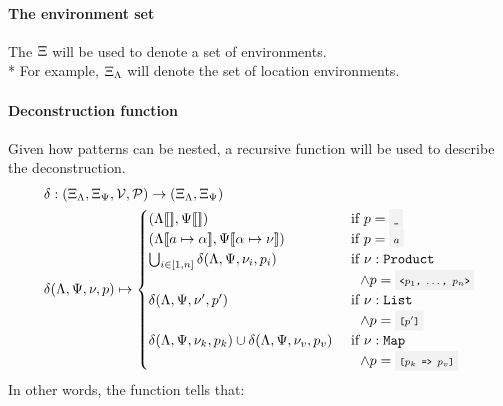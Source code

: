 \paragraph{The environment set} The $\Xi$ will be used to denote a set of
environments.\\*
For example, $\Xi_\Lambda$ will denote the set of location environments.

\paragraph{Deconstruction function} Given how patterns can be nested, a
recursive function will be used to describe the deconstruction.
\[
	\begin{split}
		\decons& : (\Env_\EnvLoc,\Env_\EnvStore,\Val,\Pattern) \to (\Env_\EnvLoc,\Env_\EnvStore) \\*
		\decons&(\EnvLoc,\EnvStore,\val, \pattern) \mapsto \begin{cases}
			(\EnvLoc\env{},\EnvStore\env{})                                                              &\text{ if } \pattern = \code{\_} \\*
			(\EnvLoc\env{a\mapsto\addr},\EnvStore\env{\addr\mapsto\val})                                 &\text{ if } \pattern = \code{$a$} \\*
			\bigcup_{i\in[1,n]}{\decons(\EnvLoc,\EnvStore,\val_i,\pattern_i)}                            &\text{ if } \val:\Product \\*
																										 &\quad\land \pattern = \code{<$\pattern_1$, $\dotsc$, $\pattern_n$>} \\*
			\decons(\EnvLoc,\EnvStore,\val',\pattern')                                                   &\text{ if } \val:\List \\*
																										 &\quad\land \pattern = \code{[$\pattern'$]} \\*
			\decons(\EnvLoc,\EnvStore,\val_k,\pattern_k)\cup\decons(\EnvLoc,\EnvStore,\val_v,\pattern_v) &\text{ if } \val:\Map \\*
																										 &\quad\land \pattern = \code{[$\pattern_k$ => $\pattern_v$]} \\*
		\end{cases}
	\end{split}
\]
In other words, the function tells that:
